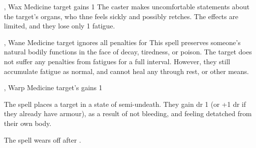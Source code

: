   {\mFate, \mAir}%
  {Wax}%
  {}%
  {Medicine}%
  {target gains 1 }%
  {
    The caster makes uncomfortable statements about the target's organs, who thne feels sickly and possibly retches.
    The effects are limited, and they lose only 1 \gls{fatigue}.
  }

  {\mFate, \mAir}%
  {Wane}%
  {}%
  {Medicine}%
  {target ignores all  penalties for }%
  {
    This spell preserves someone's natural bodily functions in the face of decay, tiredness, or poison.
    The target does not suffer any penalties from \glspl{fatigue} for a full \gls{interval}.
    However, they still accumulate \gls{fatigue} as normal, and cannot heal any through rest, or other means.
  }

  {\mFate, \mAir}%
  {Warp}%
  {}%
  {Medicine}%
  {target's gains  1}%
  {
    The spell places a target in a state of semi-undeath.
    They gain \gls{dr} 1 (or +1 \gls{dr} if they already have armour), as a result of not bleeding, and feeling detatched from their own body.

    The spell wears off after .
  }

